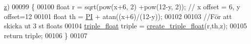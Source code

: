 \begin{DoxyCode}
      \hyperlink{over__hinder_8c_af73583b1e980b0aa03f9884812e9fd4d}{z})
00099 \{
00100     \textcolor{keywordtype}{float} r = sqrt(pow(x+6, 2) +pow(12-y, 2)); \textcolor{comment}{// x offset = 6, y offset=12}
00101     \textcolor{keywordtype}{float} th = \hyperlink{invers__kinematik_8c_a598a3330b3c21701223ee0ca14316eca}{PI} + atan((x+6)/(12-y));
00102     
00103     \textcolor{comment}{//För att skicka ut 3 st floats }
00104     \hyperlink{structtriple__float}{triple\_float} triple = \hyperlink{structs_8c_a32f52471299d0d08c34e0dc70f2296d6}{create\_triple\_float}(r,th,z);
00105     \textcolor{keywordflow}{return} triple;
00106 \}
00107 
\end{DoxyCode}
